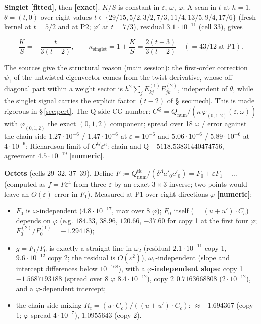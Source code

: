 \documentclass[10pt]{article}
\begin{document}
\textbf{Singlet} \textbf{[fitted]}, then \textbf{[exact]}. $K/S$ is constant in $\varepsilon$, $\omega$, $\varphi$. A scan in $t$ at $h=1$, $\theta=(t,0)$ over eight values $t\in\{29/15,5/2,3/2,7/3,11/4,13/5,9/4,17/6\}$ (fresh kernel at $t=5/2$ and at P2; $\varphi'$ at $t=7/3$), residual $3.1\cdot10^{-11}$ (cell 33), gives

\[
\frac KS=-\frac{t}{3(t-2)},\qquad \kappa_{\mathrm{singlet}}=1+\frac KS=\frac{2(t-3)}{3(t-2)}\quad(=43/12\ \text{at P1}).
\]

The sources give the structural reason (main session): the first-order correction $\psi_1$ of the untwisted eigenvector comes from the twist derivative, whose off-diagonal part within a weight sector is $h^2\sum_jE^{(1)}_{kj}E^{(2)}_{jk}$, independent of $\theta$, while the singlet signal carries the explicit factor $(t-2)$ of \S\,\ref{sec:mech}. This is made rigorous in \S\,\ref{sec:pert}. The Q-side CG number: $C^Q=Q_{\mathrm{num}}/(\kappa\,\varphi_{(0,1,2)}(\varepsilon,\omega))$ with $\varphi_{(0,1,2)}$ the exact $(0,1,2)$ component; spread over 18 $\omega$ / error against the chain side $1.27\cdot10^{-6}$ / $1.47\cdot10^{-6}$ at $\varepsilon=10^{-6}$ and $5.06\cdot10^{-6}$ / $5.89\cdot10^{-6}$ at $4\cdot10^{-6}$; Richardson limit of $C^Q\varepsilon^{6}$: chain and Q $-5118.53831440474756$, agreement $4.5\cdot10^{-19}$ \textbf{[numeric]}.

\textbf{Octets} (cells 29--32, 37--39). Define $F:=Q_{\mathrm{num}}^{\mathrm{tk}}/(\delta^\Lambda a'_0c'_0)=F_0+\varepsilon F_1+\dots$ (computed as $f=F\varepsilon^4$ from three $\varepsilon$ by an exact $3\times3$ inverse; two points would leave an $O(\varepsilon)$ error in $F_1$). Measured at P1 over eight directions $\varphi$ \textbf{[numeric]}:

\begin{itemize}\setlength{\itemsep}{1pt}
\item $F_0$ is $\omega$-independent ($4.8\cdot10^{-17}$, max over 8 $\varphi$); $F_0$ itself ($=(u+u')\cdot C_c$) depends on $\varphi$ (e.g. $184.33$, $38.96$, $120.66$, $-37.60$ for copy 1 at the first four $\varphi$; $F_0^{(2)}/F_0^{(1)}=-1.29418$);
\item $g=F_1/F_0$ is exactly a straight line in $\omega_2$ (residual $2.1\cdot10^{-11}$ copy 1, $9.6\cdot10^{-12}$ copy 2; the residual is $O(\varepsilon^2)$), $\omega_1$-independent (slope and intercept differences below $10^{-168}$), with a \textbf{$\varphi$-independent slope}: copy 1 $-1.5687193188$ (spread over 8 $\varphi$ $8.4\cdot10^{-12}$), copy 2 $0.7163668808$ ($2\cdot10^{-12}$), and a $\varphi$-dependent intercept;
\item the chain-side mixing $R_c=(u\cdot C_c)/((u+u')\cdot C_c)$: $\approx-1.694367$ (copy 1; $\varphi$-spread $4\cdot10^{-7}$), $1.0955643$ (copy 2).
\end{itemize}
\end{document}
